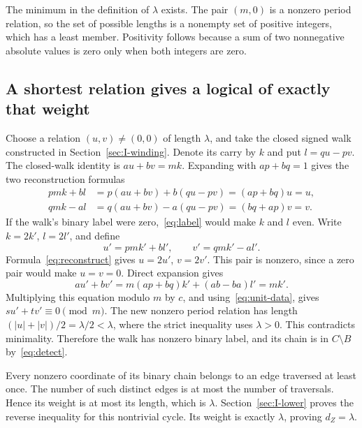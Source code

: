 \documentclass{article}
\numberwithin{equation}{section}
\begin{document}
The minimum in the definition of \(\lambda\) exists. The pair \((m,0)\)
is a nonzero period relation, so the set of possible lengths is a nonempty
set of positive integers, which has a least member. Positivity follows
because a sum of two nonnegative absolute values is zero only when both
integers are zero.

\subsection[A shortest relation gives a logical of exactly that weight]%
  {A shortest relation gives a logical of exactly\\ that weight}\label{sec:I-upper}

Choose a relation \((u,v)\ne(0,0)\) of length \(\lambda\), and take the
closed signed walk constructed in Section~\ref{sec:I-winding}. Denote its carry by \(k\)
and put \(l=qu-pv\). The closed-walk identity is \(au+bv=mk\). Expanding with
\(ap+bq=1\) gives the two reconstruction formulas
\begin{equation}\label{eq:reconstruct}
  \begin{aligned}
    pmk+bl&=p(au+bv)+b(qu-pv)=(ap+bq)u=u,\\
    qmk-al&=q(au+bv)-a(qu-pv)=(bq+ap)v=v.
  \end{aligned}
\end{equation}
If the walk's binary label were zero,~\eqref{eq:label} would make \(k\) and \(l\) even.
Write \(k=2k'\), \(l=2l'\), and define
\begin{equation}\label{eq:half-pair}
  u'=pmk'+bl',\qquad v'=qmk'-al'.
\end{equation}
Formula~\eqref{eq:reconstruct} gives \(u=2u'\), \(v=2v'\). This pair is nonzero, since a
zero pair would make \(u=v=0\). Direct expansion gives
\begin{equation}\label{eq:half-relation}
  au'+bv'=m(ap+bq)k'+(ab-ba)l'=mk'.
\end{equation}
Multiplying this equation modulo \(m\) by \(c\), and using~\eqref{eq:unit-data}, gives
\(su'+tv'\equiv0\pmod m\). The new nonzero period relation has length
\((\lvert u\rvert+\lvert v\rvert)/2=\lambda/2<\lambda\), where the strict
inequality uses \(\lambda>0\). This contradicts minimality. Therefore the
walk has nonzero binary label, and its chain is in \(C\setminus B\)
by~\eqref{eq:detect}.

Every nonzero coordinate of its binary chain belongs to an edge traversed
at least once. The number of such distinct edges is at most the number of
traversals. Hence its weight is at most its length, which is \(\lambda\).
Section~\ref{sec:I-lower} proves the reverse inequality for this nontrivial cycle. Its
weight is exactly \(\lambda\), proving \(d_Z=\lambda\).
\end{document}
